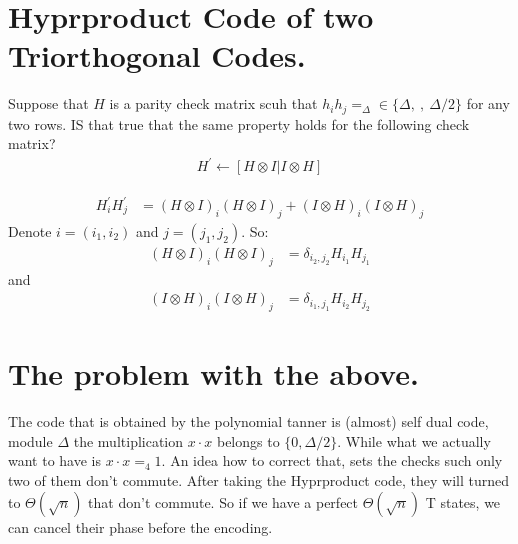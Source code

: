 \documentclass[manuscript,screen,review]{acmart}
\begin{document}
\section{Hyprproduct Code of two Triorthogonal Codes.}

Suppose that $H$ is a parity check matrix scuh that $h_{i}h_{j} =_{\Delta} \in \{\Delta , \ , \ \Delta/2 \}$ for any two rows. IS that true that the same property holds for the following check matrix? 
  \begin{equation*}
    \begin{split}
      H^{\prime} \leftarrow [ H \otimes I | I \otimes H ]
    \end{split}
  \end{equation*}


  \begin{equation*}
    \begin{split}
      H^{\prime}_{i}H^{\prime}_{j} &= (H\otimes I)_{i}(H\otimes I)_{j} + (I \otimes H)_{i}(I \otimes H)_{j} 
    \end{split}
  \end{equation*}
  Denote $i = (i_{1},i_{2})$ and $j = (j_{1},j_{2})$. So: 
  \begin{equation*}
    \begin{split}
      (H\otimes I)_{i}(H\otimes I)_{j} &= \delta_{i_{2},j_{2}} H_{i_{1}}H_{j_{1}}
    \end{split}
  \end{equation*}
  and 
\begin{equation*}
    \begin{split}
      (I \otimes H)_{i}(I \otimes H)_{j} &= \delta_{i_{1},j_{1}} H_{i_{2}}H_{j_{2}}
    \end{split}
  \end{equation*}

  \section{The problem with the above.}
  The code that is obtained by the polynomial tanner is (almost) self dual code, module $\Delta$ the multiplication $x \cdot x$ belongs to $\{ 0, \Delta/2 \}$. While what we actually want to have is $x \cdot x =_{4} 1$. An idea how to correct that, sets the checks such only two of them don't commute. After taking the Hyprproduct code, they will turned to $\Theta(\sqrt{n})$ that don't commute. So if we have a perfect $\Theta(\sqrt{n})$ T states, we can cancel their phase before the encoding.  
\end{document}
